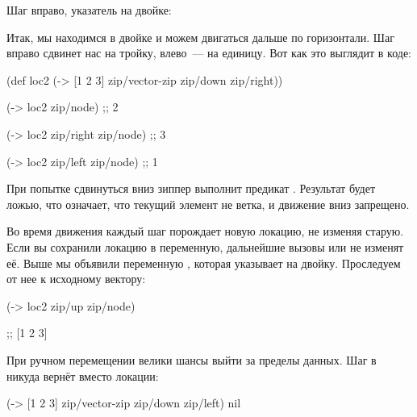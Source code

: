 \begin{figure}[H]
  \centering
  
  \label{fig:chart-zip-02}
\end{figure}

\pagebreaklarge

Шаг вправо, указатель на двойке:

\begin{figure}[H]
  \centering
  
  \label{fig:chart-zip-03}
\end{figure}

Итак, мы находимся в двойке и можем двигаться дальше по горизонтали. Шаг вправо
сдвинет нас на тройку, влево~--- на единицу. Вот как это выглядит в коде:

\begin{english}
  \begin{clojure}
(def loc2
  (-> [1 2 3]
      zip/vector-zip
      zip/down
      zip/right))

(-> loc2 zip/node)           ;; 2

(-> loc2 zip/right zip/node) ;; 3

(-> loc2 zip/left zip/node)  ;; 1
  \end{clojure}
\end{english}

При попытке сдвинуться вниз зиппер выполнит предикат . Результат
будет ложью, что означает, что текущий элемент не ветка, и движение вниз
запрещено.

Во время движения каждый шаг порождает новую локацию, не изменяя старую. Если вы
сохранили локацию в переменную, дальнейшие вызовы  или
 не изменят её. Выше мы объявили переменную , которая
указывает на двойку. Проследуем от нее к исходному вектору:

\begin{english}
  \begin{clojure}
(-> loc2 zip/up zip/node)

;; [1 2 3]
  \end{clojure}
\end{english}

\pagebreaklarge

При ручном перемещении велики шансы выйти за пределы данных. Шаг в никуда вернёт
 вместо локации:

\begin{english}
  \begin{clojure}
(-> [1 2 3]
    zip/vector-zip
    zip/down
    zip/left)
nil
  \end{clojure}
\end{english}

